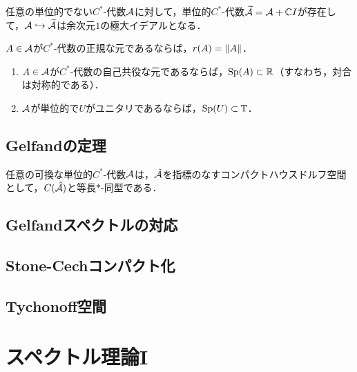 \documentclass[uplatex,dvipdfmx]{jsreport}
\begin{document}
\begin{lemma}
    任意の単位的でない$C^*$-代数$\mathcal{A}$に対して，単位的$C^*$-代数$\widetilde{\mathcal{A}}=\mathcal{A}+\mathbb{C} I$が存在して，$\mathcal{A}\hookrightarrow\widetilde{\mathcal{A}}$は余次元$1$の極大イデアルとなる．
\end{lemma}

\begin{lemma}
    $A\in\mathcal{A}$が$C^*$-代数の正規な元であるならば，$r(A)=\|A\|$．
\end{lemma}

\begin{lemma}\mbox{}
    \begin{enumerate}
        \item $A\in\mathcal{A}$が$C^*$-代数の自己共役な元であるならば，$\mathrm{Sp}(A)\subset\mathbb{R}$（すなわち，対合は対称的である）．
        \item $\mathcal{A}$が単位的で$U$がユニタリであるならば，$\mathrm{Sp}(U)\subset\mathbb{T}$．
    \end{enumerate}
\end{lemma}

\subsection{Gelfandの定理}

\begin{theorem}
    任意の可換な単位的$C^*$-代数$\mathcal{A}$は，$\hat{\mathcal{A}}$を指標のなすコンパクトハウスドルフ空間として，$C(\hat{\mathcal{A}})$と等長$*$-同型である．
\end{theorem}

\begin{corollary}
    
\end{corollary}

\subsection{Gelfandスペクトルの対応}

\subsection{Stone-Cechコンパクト化}

\subsection{Tychonoff空間}

\section{スペクトル理論I}
\end{document}
